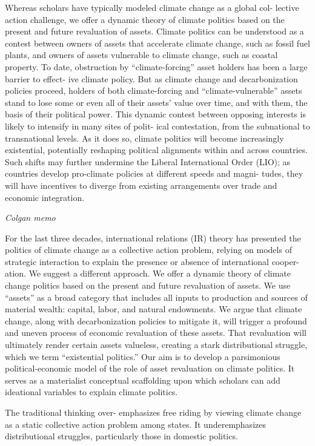 \documentclass[
]{book}
\begin{document}
Whereas scholars have typically modeled climate change as a global col-
lective action challenge, we offer a dynamic theory of climate politics based on the
present and future revaluation of assets. Climate politics can be understood as a
contest between owners of assets that accelerate climate change, such as fossil fuel
plants, and owners of assets vulnerable to climate change, such as coastal property.
To date, obstruction by ``climate-forcing'' asset holders has been a large barrier to effect-
ive climate policy. But as climate change and decarbonization policies proceed, holders
of both climate-forcing and ``climate-vulnerable'' assets stand to lose some or even all of
their assets' value over time, and with them, the basis of their political power. This
dynamic contest between opposing interests is likely to intensify in many sites of polit-
ical contestation, from the subnational to transnational levels. As it does so, climate
politics will become increasingly existential, potentially reshaping political alignments
within and across countries. Such shifts may further undermine the Liberal International
Order (LIO); as countries develop pro-climate policies at different speeds and magni-
tudes, they will have incentives to diverge from existing arrangements over trade and
economic integration.

\emph{Colgan memo}

For the last three decades, international relations (IR) theory has presented the
politics of climate change as a collective action problem, relying on models of
strategic interaction to explain the presence or absence of international cooper-
ation. We suggest a different approach. We offer a dynamic theory of climate
change politics based on the present and future revaluation of assets. We use
``assets'' as a broad category that includes all inputs to production and sources of
material wealth: capital, labor, and natural endowments. We argue that climate
change, along with decarbonization policies to mitigate it, will trigger a profound
and uneven process of economic revaluation of these assets. That revaluation will
ultimately render certain assets valueless, creating a stark distributional struggle,
which we term ``existential politics.'' Our aim is to develop a parsimonious
political-economic model of the role of asset revaluation on climate politics. It
serves as a materialist conceptual scaffolding upon which scholars can add ideational
variables to explain climate politics.

The traditional thinking over-
emphasizes free riding by viewing climate change as a static collective action
problem among states.
It underemphasizes distributional struggles, particularly
those in domestic politics.
\end{document}
